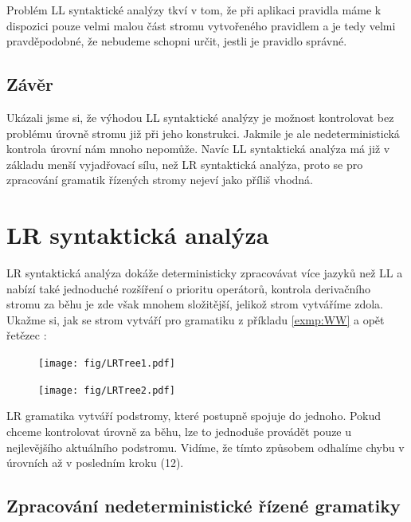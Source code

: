 Problém LL syntaktické analýzy tkví v tom, že při aplikaci pravidla máme k
dispozici pouze velmi malou část stromu vytvořeného pravidlem a je tedy velmi
pravděpodobné, že nebudeme schopni určit, jestli je pravidlo správné.\\

\subsection*{Závěr}

Ukázali jsme si, že výhodou LL syntaktické analýzy je možnost kontrolovat
bez problému úrovně stromu již při jeho konstrukci.
Jakmile je ale  nedeterministická kontrola úrovní
nám mnoho nepomůže.
Navíc LL syntaktická analýza má již v základu menší vyjadřovací sílu, než
LR syntaktická analýza, proto se pro zpracování gramatik řízených stromy
nejeví jako příliš vhodná.

\section{LR syntaktická analýza}
\label{subsection:LR}
LR syntaktická analýza dokáže deterministicky zpracovávat více jazyků
než LL a nabízí také jednoduché rozšíření o prioritu operátorů,
kontrola derivačního stromu za běhu je zde však mnohem složitější,
jelikož strom vytváříme zdola. Ukažme si, jak se strom vytváří pro
gramatiku z příkladu \ref{exmp:WW} a opět řetězec :

\begin{figure}[H]
  \centering
  \texttt{[image: fig/LRTree1.pdf]}
\end{figure}

\begin{figure}[H]
  \centering
  \texttt{[image: fig/LRTree2.pdf]}
\end{figure}

LR gramatika vytváří podstromy, které postupně spojuje do jednoho.
Pokud chceme kontrolovat úrovně za běhu, lze to jednoduše provádět pouze
u nejlevějšího aktuálního podstromu.
Vidíme, že tímto způsobem odhalíme chybu v úrovních až v posledním kroku (12).\\

\subsection{Zpracování nedeterministické řízené gramatiky}

